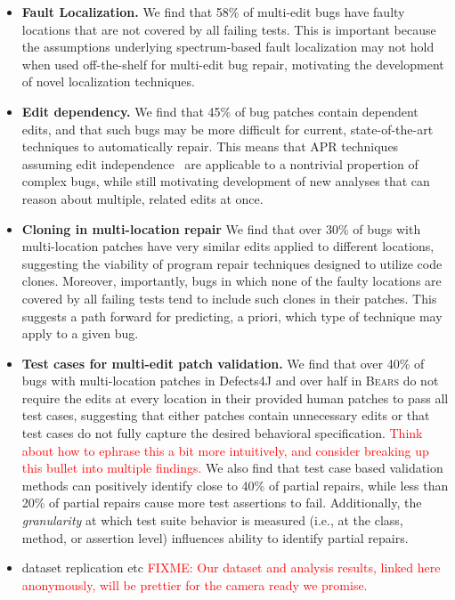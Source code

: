\documentclass[10pt, conference]{IEEEtran}
\newcommand\todo[1]{\textcolor{red}{#1}}
\newcommand\bears{\textsc{Bears}\xspace}
\begin{document}
\begin{itemize}
\item \textbf{Fault Localization.}  We find that 58\% of multi-edit bugs have faulty locations that are not
  covered by all failing tests.  This is important because the assumptions underlying spectrum-based
  fault localization may not hold when used off-the-shelf for
  multi-edit bug repair, motivating the development of novel localization
  techniques. 
\item \textbf{Edit dependency.} We 
find that 45\% of bug patches contain dependent edits, and that such bugs
may be more difficult for current, state-of-the-art
techniques to automatically repair.  This means that APR techniques assuming edit
independence~\cite{hercules,theotherone} are applicable to a nontrivial propertion of complex bugs, while
still motivating development of new analyses that can reason about multiple,
related edits at once. 
\item \textbf{Cloning in multi-location repair} We find that over 30\% of bugs with multi-location
patches have very similar edits applied to different locations, suggesting the viability of 
program repair techniques designed to utilize code clones. Moreover, importantly, bugs in which 
none of the faulty locations are covered by all failing tests tend to include
such clones in their patches.  This suggests a path forward for predicting, a
priori, which type of technique may apply to a given bug. 
\item \textbf{Test cases for multi-edit patch validation.} We find that over 40\% of bugs with multi-location
  patches in Defects4J and over half in \bears do not require the edits at every
  location in their provided human patches to pass all test cases, suggesting
  that either patches contain unnecessary edits or that test cases
  do not fully capture the desired behavioral specification.  \todo{Think about
    how to ephrase this a bit more intuitively, and consider breaking up this
    bullet into multiple findings.} We also find that test 
  case based validation methods can positively identify close to 40\% of partial repairs,
  while less than
  20\% of partial repairs cause more test assertions to fail. Additionally, the 
  \emph{granularity} at which test suite behavior is measured (i.e., at the class,
  method, or assertion level) influences ability to identify partial
  repairs. 
\item dataset replication etc \todo{FIXME: Our dataset and analysis results,
    linked here anonymously, will be prettier for the camera ready we promise.}
\end{itemize}
\end{document}
